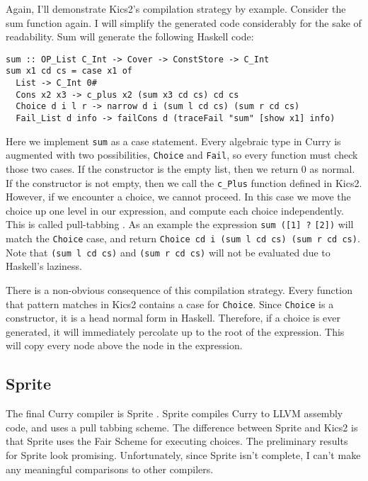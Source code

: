 Again, I'll demonstrate Kics2's compilation strategy by example.
Consider the sum function again.
I will simplify the generated code considerably for the sake of readability.
Sum will generate the following Haskell code:

\begin{verbatim}
sum :: OP_List C_Int -> Cover -> ConstStore -> C_Int
sum x1 cd cs = case x1 of
  List -> C_Int 0#
  Cons x2 x3 -> c_plus x2 (sum x3 cd cs) cd cs
  Choice d i l r -> narrow d i (sum l cd cs) (sum r cd cs)
  Fail_List d info -> failCons d (traceFail "sum" [show x1] info)

\end{verbatim}

Here we implement \texttt{sum} as a case statement.
Every algebraic type in Curry is augmented with two possibilities, \texttt{Choice} and \texttt{Fail},
so every function must check those two cases.
If the constructor is the empty list, then we return 0 as normal.
If the constructor is not empty, then we call the \texttt{c\_Plus} function defined in Kics2.
However, if we encounter a choice, we cannot proceed.
In this case we move the choice up one level in our expression, and compute each choice independently.
This is called pull-tabbing \cite{pullTab,Antoy11ICLP}.
As an example the expression \texttt{sum ([1] ?} \texttt{[2])} will match the \texttt{Choice} case, and return 
\texttt{Choice cd i (sum l cd cs) (sum r cd cs)}.
Note that \texttt{(sum l cd cs)} and \texttt{(sum r cd cs)} will not be evaluated due to Haskell's laziness.

There is a non-obvious consequence of this compilation strategy.
Every function that pattern matches in Kics2 contains a case for \texttt{Choice}.
Since \texttt{Choice} is a constructor, it is a head normal form in Haskell.
Therefore, if a choice is ever generated,
it will immediately percolate up to the root of the expression.
This will copy every node above the node in the expression.

\subsection{Sprite}
The final Curry compiler is Sprite \cite{AntoyJost16LOPSTR}.
Sprite compiles Curry to LLVM assembly code, and uses a pull tabbing scheme.
The difference between Sprite and Kics2 is that Sprite uses the Fair Scheme \cite{fair_scheme} for executing choices.
The preliminary results for Sprite look promising.
Unfortunately, since Sprite isn't complete, I can't make any meaningful comparisons to other compilers.

